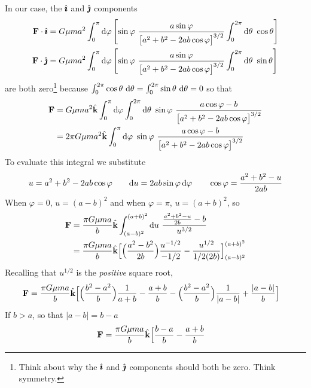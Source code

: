 \begin{eg}
In our case,
the $\hat{\pmb{\imath}}$ and $\hat{\pmb{\jmath}}$ components 
\begin{align*}
\vF\cdot\hi & = G\mu m a^2 \int_0^\pi\dee{\varphi} \left[
\sin\varphi\ 
    \frac{a\sin\varphi}
         {\big[a^2+b^2 -2ab\cos\varphi\big]^{3/2}}
\int_0^{2\pi}\dee{\theta}\ \cos\theta
\right] \\
\vF\cdot\hj & = G\mu m a^2\int_0^\pi\dee{\varphi}\left[
 \sin\varphi\ 
    \frac{a\sin\varphi}
         {\big[a^2+b^2 -2ab\cos\varphi\big]^{3/2}}
\int_0^{2\pi}\dee{\theta}\ \sin\theta
\right]
\end{align*}
are both zero\footnote{Think about why the $\hat{\pmb{\imath}}$ and $\hat{\pmb{\jmath}}$ components
should both be zero. Think symmetry.} because
$\int_0^{2\pi}\cos\theta\ \mathrm{d}\theta
           =\int_0^{2\pi}\sin\theta\ \mathrm{d}\theta
           =0$
so that
\begin{align*}
\vF 
&=  G\mu m a^2 \hk\int_0^\pi\dee{\varphi} \int_0^{2\pi}\dee{\theta}\ \sin\varphi\ 
    \frac{a\cos\varphi-b}
         {\big[a^2+b^2 -2ab\cos\varphi\big]^{3/2}} \\
&=  2\pi G\mu m a^2 \hk\int_0^\pi\dee{\varphi}\ \sin\varphi\ 
    \frac{a\cos\varphi-b}
         {\big[a^2+b^2 -2ab\cos\varphi\big]^{3/2}}
\end{align*}
To evaluate this integral we substitute
\begin{align*}
u=a^2+b^2 -2ab\cos\varphi\qquad
\mathrm{d}u = 2ab\sin\varphi\,\mathrm{d}\varphi\qquad
\cos\varphi = \frac{a^2+b^2-u}{2ab}
\end{align*}
When $\varphi=0$, $u=(a-b)^2$ and when $\varphi =\pi$, $u=(a+b)^2$, so
\begin{align*}
\mathbf{F} 
&=  \frac{\pi G\mu m a}{b} \hat{\mathbf{k}}\int_{(a-b)^2}^{(a+b)^2} 
     \mathrm{d}u\  \frac{\frac{a^2+b^2-u}{2b}-b}  {u^{3/2}} \\
&=  \frac{\pi G\mu m a}{b} \hat{\mathbf{k}}\Big[ 
      \Big(\frac{a^2-b^2}{2b}\Big)\frac{u^{-1/2}}{-1/2}
            -\frac{u^{1/2}}{1/2(2b)}
   \Big]_{(a-b)^2}^{(a+b)^2}\\
\end{align*}
Recalling that $u^{1/2}$ is the \emph{positive} square root,
\begin{align*}
\mathbf{F}&=\frac{\pi G\mu m a}{b} \hat{\mathbf{k}}\Big[ 
      \Big(\frac{b^2-a^2}{b}\Big)\frac{1}{a+b}
            -\frac{a+b}{b}
            -\Big(\frac{b^2-a^2}{b}\Big)\frac{1}{|a-b|}
            +\frac{|a-b|}{b}
   \Big]
\end{align*}
If $b>a$, so that $|a-b|=b-a$
\begin{align*}
\vF&=\frac{\pi G\mu m a}{b} \hk\Big[ 
       \frac{b-a}{b}
            -\frac{a+b}{b}

\end{align*}
\end{eg}

